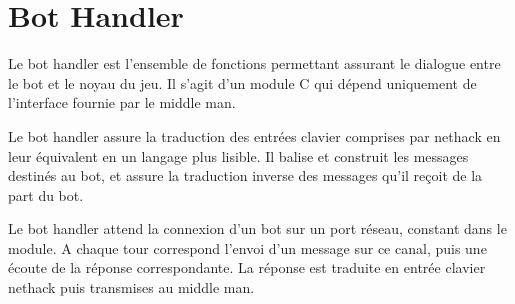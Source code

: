 \section{Bot Handler}

Le bot handler est l'ensemble de fonctions permettant assurant le dialogue
entre le bot et le noyau du jeu. Il s'agit d'un module C qui dépend uniquement de
l'interface fournie par le middle man.

Le bot handler assure la traduction des entrées clavier comprises par nethack en 
leur équivalent en un langage plus lisible. Il balise et construit les messages destinés
au bot, et assure la traduction inverse des messages qu'il reçoit de la part du bot.

Le bot handler attend la connexion d'un bot sur un port réseau, constant dans le module.
A chaque tour correspond l'envoi d'un message sur ce canal, puis une écoute de la réponse
correspondante. La réponse est traduite en entrée clavier nethack puis transmises au middle man.

